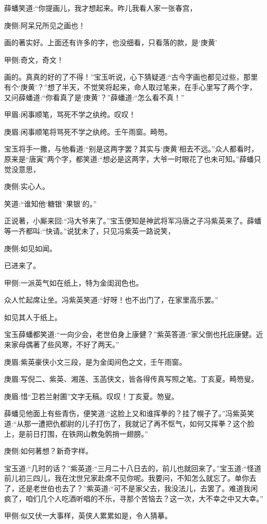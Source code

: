 \begin{parag}
    薛蟠笑道:“你提画儿，我才想起来。昨儿我看人家一张春宫，\begin{note}庚侧:阿呆兄所见之画也！\end{note}画的著实好。上面还有许多的字，也没细看，只看落的款，是‘庚黄’\begin{note}甲侧:奇文，奇文！\end{note}画的。真真的好的了不得！”宝玉听说，心下猜疑道:“古今字画也都见过些，那里有个‘庚黄’？”想了半天，不觉笑将起来，命人取过笔来，在手心里写了两个字，又问薛蟠道:“你看真了是‘庚黄’？”薛蟠道:“怎么看不真！”\begin{note}甲眉:闲事顺笔，骂死不学之纨绔。叹叹！\end{note}\begin{note}庚眉:闲事顺笔将骂死不学之纨绔。壬午雨窗。畸笏。\end{note}宝玉将手一撒，与他看道:“别是这两字罢？其实与‘庚黄’相去不远。”众人都看时，原来是“唐寅”两个字，都笑道:“想必是这两字，大爷一时眼花了也未可知。”薛蟠只觉没意思，\begin{note}庚侧:实心人。\end{note}笑道:“谁知他‘糖银’‘果银’的。”
\end{parag}


\begin{parag}
    正说著，小厮来回:“冯大爷来了。”宝玉便知是神武将军冯唐之子冯紫英来了。薛蟠等一齐都叫:“快请。”说犹未了，只见冯紫英一路说笑，\begin{note}庚侧:如见如闻。\end{note}已进来了。\begin{note}甲侧:一派英气如在纸上，特为金闺润色也。\end{note}众人忙起席让坐。冯紫英笑道:“好呀！也不出门了，在家里高乐罢。”\begin{note}如见其人于纸上。\end{note}宝玉薛蟠都笑道:“一向少会，老世伯身上康健？”紫英答道:“家父倒也托庇康健。近来家母偶著了些风寒，不好了两天。”\begin{note}庚眉:紫英豪侠小文三段，是为金闺间色之文，壬午雨窗。\end{note}\begin{note}庚眉:写倪二、紫英、湘莲、玉菡侠文，皆各得传真写照之笔。丁亥夏。畸笏叟。\end{note}\begin{note}庚眉:惜“卫若兰射圃”文字无稿。叹叹！丁亥夏。笏叟。\end{note}薛蟠见他面上有些青伤，便笑道:“这脸上又和谁挥拳的？挂了幌子了。”冯紫英笑道:“从那一遭把仇都尉的儿子打伤了，我就记了再不怄气，如何又挥拳？这个脸上，是前日打围，在铁网山教兔鹘捎一翅膀。”\begin{note}庚侧:如何著想？新奇字样。\end{note}宝玉道:“几时的话？”紫英道:“三月二十八日去的，前儿也就回来了。”宝玉道:“怪道前儿初三四儿，我在沈世兄家赴席不见你呢。我要问，不知怎么就忘了。单你去了，还是老世伯也去了？”紫英道:“可不是家父去，我没法儿，去罢了。难道我闲疯了，咱们几个人吃酒听唱的不乐，寻那个苦恼去？这一次，大不幸之中又大幸。”\begin{note}甲侧:似又伏一大事样，英侠人累累如是，令人猜摹。\end{note}
\end{parag}


